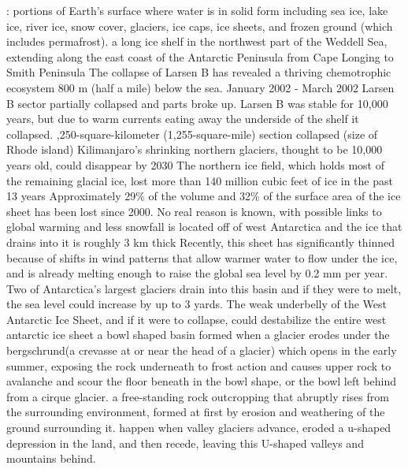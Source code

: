 		: portions of Earth’s surface where water is in solid form including sea ice, lake ice, river ice, snow cover, glaciers, ice caps, ice sheets, and frozen ground (which includes permafrost).
			a long ice shelf in the northwest part of the Weddell Sea, extending along the east coast of the Antarctic Peninsula from Cape Longing to Smith Peninsula
			\ddd The collapse of Larsen B has revealed a thriving chemotrophic ecosystem 800 m (half a mile) below the sea.
			 January 2002 - March 2002 Larsen B sector partially collapsed and parts broke up. 
			\ddd Larsen B was stable for 10,000 years, but due to warm currents eating away the underside of the shelf it collapsed. 
			,250-square-kilometer (1,255-square-mile) section collapsed (size of Rhode island)
			\ddd Kilimanjaro's shrinking northern glaciers, thought to be 10,000 years old, could disappear by 2030
			\ddd The northern ice field, which holds most of the remaining glacial ice, lost more than 140 million cubic feet of ice in the past 13 years
			\ddd Approximately 29\% of the volume and 32\% of the surface area of the ice sheet has been lost since 2000.
			\ddd No real reason is known, with possible links to global warming and less snowfall
			\ddd is located off of west Antarctica and the ice that drains into it is roughly 3 km thick
			\ddd Recently, this sheet has significantly thinned because of shifts in wind patterns that allow warmer water to flow under the ice, and is already melting enough to raise the global sea level by 0.2 mm per year. 
			\ddd Two of Antarctica's largest glaciers drain into this basin and if they were to melt, the sea level could increase by up to 3 yards. 
			\ddd The weak underbelly of the West Antarctic Ice Sheet, and if it were to collapse, could destabilize the entire west antarctic ice sheet
		 a bowl shaped basin formed when a glacier erodes under the bergschrund(a crevasse at or near the head of a glacier) which opens in the early summer, exposing the rock underneath to frost action and causes upper rock to avalanche and scour the floor beneath in the bowl shape, or the bowl left behind from a cirque glacier.
		 a free-standing rock outcropping that abruptly rises from the surrounding environment, formed at first by erosion and weathering of the ground surrounding it.
		 happen when valley glaciers advance, eroded a u-shaped depression in the land, and then recede, leaving this U-shaped valleys and mountains behind.

